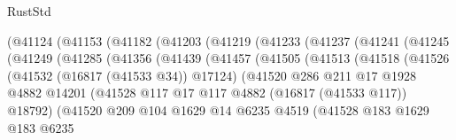 \begin{lexlean}{RustStd}
\begin{coremodule}
                    (@41124
                      (@41153
                        (@41182
                          (@41203
                            (@41219
                              (@41233
                                (@41237
                                  (@41241
                                    (@41245
                                      (@41249
                                        (@41285
                                          (@41356
                                            (@41439
                                              (@41457
                                                (@41505
                                                  (@41513
                                                    (@41518
                                                      (@41526
                                                        (@41532 (@16817 (@41533 @34)) @17124)
                                                        (@41520
                                                          @286
                                                          @211
                                                          @17
                                                          @1928
                                                          @4882
                                                          @14201
                                                          (@41528
                                                            @117
                                                            @17
                                                            @117
                                                            @4882
                                                            (@16817 (@41533 @117))
                                                            @18792)
                                                          (@41520
                                                            @209
                                                            @104
                                                            @1629
                                                            @14
                                                            @6235
                                                            @4519
                                                            (@41528
                                                              @183
                                                              @1629
                                                              @183
                                                              @6235

\end{coremodule}
\end{lexlean}
